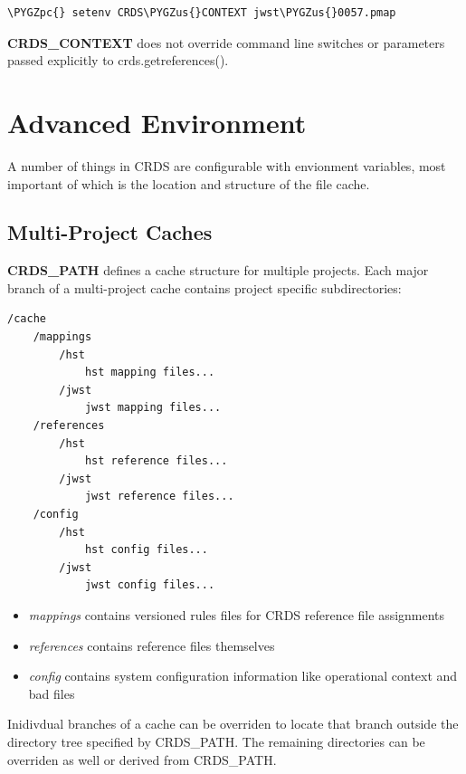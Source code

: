\documentclass[letterpaper,10pt,english]{sphinxmanual}
\def\PYGZus{\char`\_}
\def\PYGZpc{\char`\%}
\begin{document}
\begin{Verbatim}[commandchars=\\\{\}]
\PYGZpc{} setenv CRDS\PYGZus{}CONTEXT jwst\PYGZus{}0057.pmap
\end{Verbatim}

\textbf{CRDS\_CONTEXT} does not override command line switches or parameters passed explicitly to crds.getreferences().


\section{Advanced Environment}
\label{installation:advanced-environment}
A number of things in CRDS are configurable with envionment variables,  most important of which is the
location and structure of the file cache.


\subsection{Multi-Project Caches}
\label{installation:multi-project-caches}
\textbf{CRDS\_PATH} defines a cache structure for multiple projects. Each major branch of a multi-project cache
contains project specific subdirectories:

\begin{Verbatim}[commandchars=\\\{\}]
/cache
    /mappings
        /hst
            hst mapping files...
        /jwst
            jwst mapping files...
    /references
        /hst
            hst reference files...
        /jwst
            jwst reference files...
    /config
        /hst
            hst config files...
        /jwst
            jwst config files...
\end{Verbatim}
\begin{itemize}
\item {} 
\emph{mappings} contains versioned rules files for CRDS reference file assignments

\item {} 
\emph{references} contains reference files themselves

\item {} 
\emph{config} contains system configuration information like operational context and bad files

\end{itemize}

Inidivdual branches of a cache can be overriden to locate that branch outside the directory
tree specified by CRDS\_PATH.   The remaining directories can be overriden as well or derived
from CRDS\_PATH.
\end{document}
